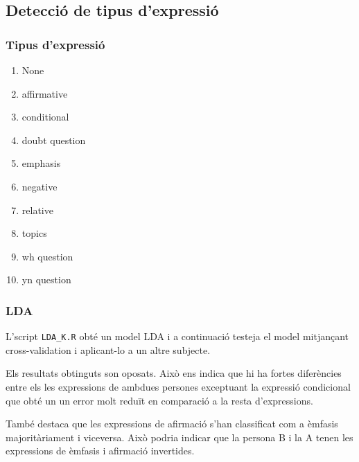 \documentclass[a4paper]{article}
\begin{document}
\subsection{Detecció de tipus d'expressió}
\subsubsection{Tipus d'expressió}
\label{sec:tipus_expressio}
\begin{multicols}{3}
	\begin{enumerate}
		\item None 
		\item affirmative 
		\item conditional 
		\item doubt question 
		\item emphasis 
		\item negative 
		\item relative 
		\item topics 
		\item wh question 
		\item yn question
	\end{enumerate}
\end{multicols}

\subsubsection{LDA}

L’script \verb|LDA_K.R|  obté un model LDA i a continuació testeja el model mitjançant cross-validation i aplicant-lo a un altre subjecte.

Els resultats obtinguts son oposats. Això ens indica que hi ha fortes diferències entre els les expressions de ambdues persones exceptuant la expressió condicional que obté un un error molt reduït en comparació a la resta d’expressions.

També destaca que les expressions de afirmació s’han classificat com a èmfasis majoritàriament i viceversa. Això podria indicar que la persona B i la A tenen les expressions de èmfasis i afirmació invertides.
\end{document}
